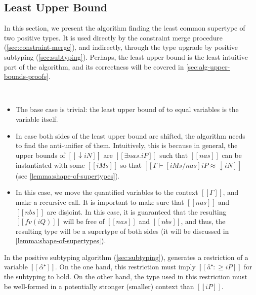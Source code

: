 \documentclass[acmsmall,natbib=false,review,anonymous]{acmart}
\begin{document}
\subsection{Least Upper Bound}
\label{sec:lub}

In this section, we present
the algorithm finding the least common supertype of two positive types. 
It is used directly by the constraint merge procedure (\cref{sec:constraint-merge}),
and indirectly, through the type upgrade by positive subtyping
(\cref{sec:subtyping}). Perhaps, the least upper bound is the least 
intuitive part of the algorithm, and its correctness will be covered
in \cref{sec:alg-upper-bounds-proofs}.

\begin{algorithm}
  \hfill\\
  \ottdefnLUBNsubLabeled{}
\end{algorithm}

\begin{itemize}
  \item {}
    The base case is trivial: 
    the least upper bound of to equal variables
    is the variable itself.
  \item {}
    In case both sides of the least upper bound are shifted,
    the algorithm needs to find the anti-unifier of them. 
    Intuitively, this is because in general, the upper bounds of
    $[[↓iN]]$ are $[[∃nas.iP]]$ such that 
    $[[nas]]$ can be instantiated with some $[[iMs]]$ so that
    $[[ Γ ⊢ [iMs/nas]iP ≈ ↓iN ]]$ (see \cref{lemma:shape-of-supertypes}).
  \item {}
    In this case, we move the quantified variables to the context $[[Γ]]$, 
    and make a recursive call. 
    It is important to make sure that $[[nas]]$ and $[[nbs]]$ are disjoint.
    In this case, it is guaranteed that the resulting 
    $[[fv(iQ)]]$ will be free of $[[nas]]$ and $[[nbs]]$,
    and thus, the resulting type will be a supertype of both sides
    (it will be discussed in \cref{lemma:shape-of-supertypes}).
\end{itemize}


In the positive subtyping algorithm (\cref{sec:subtyping}),
generates a restriction of a variable $[[α̂⁺]]$.
On the one hand, this restriction must imply 
$[[â⁺ :≥ iP]]$ for the subtyping to hold.
On the other hand, the type used in this restriction 
must be well-formed in a potentially stronger (smaller) 
context than $[[iP]]$.
\end{document}
